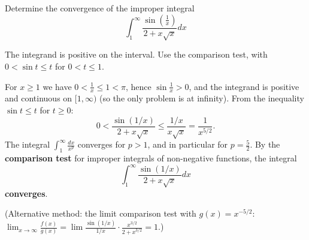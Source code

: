 
\begin{question}
Determine the convergence of the improper integral
\[ \int_1^\infty\frac{\sin(\frac1x)}{2+x\sqrt{x}}dx \]
\end{question}

\begin{hint}
The integrand is positive on the interval. Use the comparison test, with $0<\sin t\le t$ for $0<t\le1$.
\end{hint}

\begin{solution}
For $x\ge1$ we have $0<\frac1x\le1<\pi$, hence $\sin\frac1x>0$, and the integrand is positive and continuous on $[1,\infty)$ (so the only problem is at infinity). From the inequality $\sin t\le t$ for $t\ge0$:
\[ 0<\frac{\sin(1/x)}{2+x\sqrt x}\le\frac{1/x}{x\sqrt x}=\frac{1}{x^{5/2}}. \]
The integral $\int_1^\infty\frac{dx}{x^{p}}$ converges for $p>1$, and in particular for $p=\frac52$. By the \textbf{comparison test} for improper integrals of non-negative functions, the integral
\[ \int_1^\infty\frac{\sin(1/x)}{2+x\sqrt x}dx \]
\textbf{converges}.

(Alternative method: the limit comparison test with $g(x)=x^{-5/2}$: $\lim_{x\to\infty}\frac{f(x)}{g(x)}=\lim\frac{\sin(1/x)}{1/x}\cdot\frac{x^{3/2}}{2+x^{3/2}}=1$.)
\end{solution}
